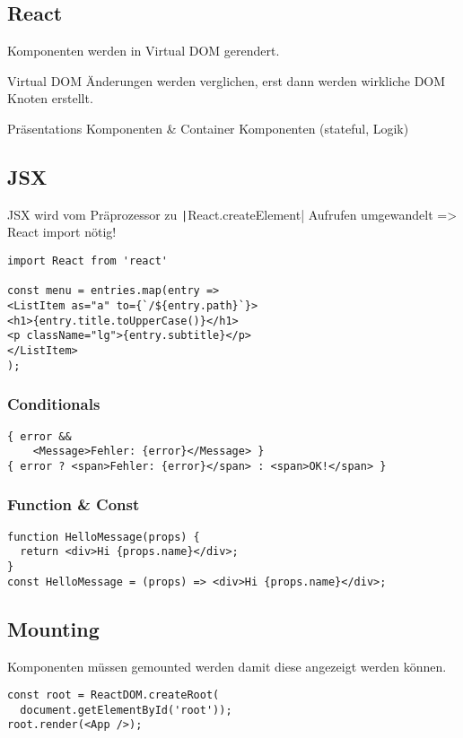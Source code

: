 \begin{multicols*}{2}
\section{React}

Komponenten werden in Virtual DOM gerendert.

Virtual DOM Änderungen werden verglichen, erst dann werden wirkliche DOM Knoten erstellt.

Präsentations Komponenten \& Container Komponenten (stateful, Logik)

\subsection{JSX}
JSX wird vom Präprozessor zu \texttt|React.createElement| Aufrufen umgewandelt => React import nötig!
\begin{verbatim}
import React from 'react'

const menu = entries.map(entry =>
<ListItem as="a" to={`/${entry.path}`}>
<h1>{entry.title.toUpperCase()}</h1>
<p className="lg">{entry.subtitle}</p>
</ListItem>
);
\end{verbatim}

\subsubsection{Conditionals}
\begin{verbatim}
{ error &&
    <Message>Fehler: {error}</Message> }
{ error ? <span>Fehler: {error}</span> : <span>OK!</span> }
\end{verbatim}

\subsubsection{Function \& Const}
\begin{verbatim}
function HelloMessage(props) {
  return <div>Hi {props.name}</div>;
}
const HelloMessage = (props) => <div>Hi {props.name}</div>;
\end{verbatim}

\subsection{Mounting}
Komponenten müssen gemounted werden damit diese angezeigt werden können.
\begin{verbatim}
const root = ReactDOM.createRoot(
  document.getElementById('root'));
root.render(<App />);
\end{verbatim}


\end{multicols*}
